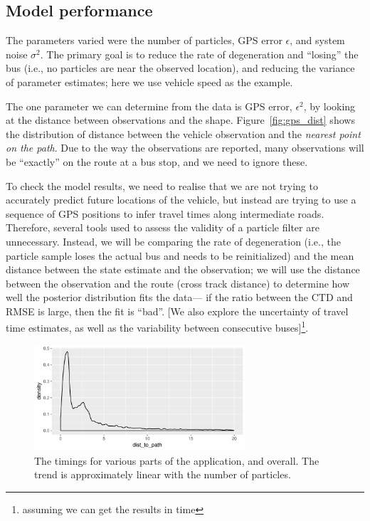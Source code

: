 \subsection{Model performance}
\label{sec:model_perf}


The parameters varied were the number of particles,
GPS error $\epsilon$, and system noise $\sigma^2$.
The primary goal is to reduce the rate of degeneration and ``losing'' the bus 
(i.e., no particles are near the observed location),
and reducing the variance of parameter estimates; here we use vehicle speed as the example.


The one parameter we can determine from the data is GPS error, $\epsilon^2$,
by looking at the distance between observations and the shape.
Figure~\ref{fig:gps_dist} shows the distribution of distance between the vehicle
observation and the \emph{nearest point on the path}.
Due to the way the observations are reported, 
many observations will be ``exactly'' on the route at a bus stop,
and we need to ignore these.


To check the model results, 
we need to realise that we are not trying to accurately predict
future locations of the vehicle,
but instead are trying to use a sequence of GPS positions to infer travel
times along intermediate roads.
Therefore, several tools used to assess the validity of a particle filter
are unnecessary.
Instead, we will be comparing the rate of degeneration 
(i.e., the particle sample loses the actual bus and needs to be reinitialized)
and the mean distance between the state estimate and the observation; 
we will use the distance between the observation and the route (cross track distance) 
to determine how well the posterior distribution fits the data---%
if the ratio between the CTD and RMSE is large,
then the fit is ``bad''.
[We also explore the uncertainty of travel time estimates,
as well as the variability between consecutive buses]\footnote{assuming we can get the results in time}.

\begin{figure}[tb]
    \centering
    \includegraphics[width=0.7\textwidth]{figures/04_model_results_dist.pdf}
    \caption{The timings for various parts of the application, and overall. %
        The trend is approximately linear with the number of particles.}
    \label{fig:dist_to_route}
\end{figure}

